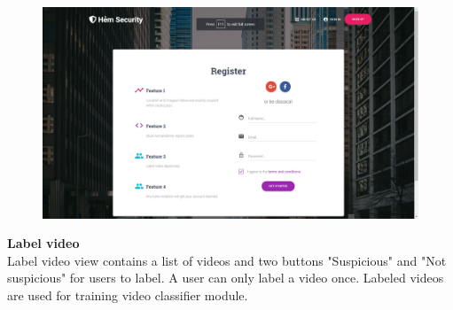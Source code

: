 \begin{figure}[!htb]
\endminipage\hfill
{}
  \includegraphics[width=\linewidth]{images/chap4/signup_form.png}
\endminipage
\end{figure}
\cleardoublepage
\textbf{Label video}
\\
Label video view contains a list of videos and two buttons "Suspicious" and "Not suspicious" for users to label. A user can only label a video once. Labeled videos are used for training video classifier module.
